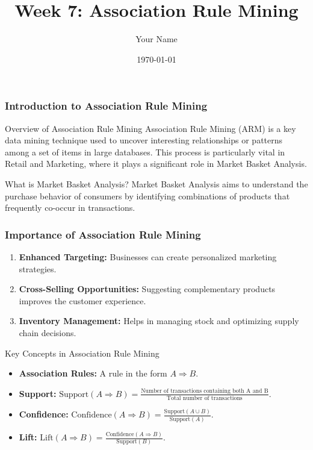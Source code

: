 \documentclass{beamer}
\title{Week 7: Association Rule Mining}
\author{Your Name}
\institute{Your Institution}
\date{\today}
\begin{document}
\frame{\titlepage}

\begin{frame}[fragile]
    \frametitle{Introduction to Association Rule Mining}
    
    \begin{block}{Overview of Association Rule Mining}
        Association Rule Mining (ARM) is a key data mining technique used to uncover interesting relationships or patterns among a set of items in large databases. This process is particularly vital in Retail and Marketing, where it plays a significant role in Market Basket Analysis.
    \end{block}
    
    \begin{block}{What is Market Basket Analysis?}
        Market Basket Analysis aims to understand the purchase behavior of consumers by identifying combinations of products that frequently co-occur in transactions.
    \end{block}
\end{frame}

\begin{frame}[fragile]
    \frametitle{Importance of Association Rule Mining}
    
    \begin{enumerate}
        \item \textbf{Enhanced Targeting:} Businesses can create personalized marketing strategies.
        
        \item \textbf{Cross-Selling Opportunities:} Suggesting complementary products improves the customer experience.
        
        \item \textbf{Inventory Management:} Helps in managing stock and optimizing supply chain decisions.
    \end{enumerate}

    \begin{block}{Key Concepts in Association Rule Mining}
        \begin{itemize}
            \item \textbf{Association Rules:} A rule in the form \(A \Rightarrow B\).
            \item \textbf{Support:} \(\text{Support}(A \Rightarrow B) = \frac{\text{Number of transactions containing both A and B}}{\text{Total number of transactions}}\).
            \item \textbf{Confidence:} \(\text{Confidence}(A \Rightarrow B) = \frac{\text{Support}(A \cup B)}{\text{Support}(A)}\).
            \item \textbf{Lift:} \(\text{Lift}(A \Rightarrow B) = \frac{\text{Confidence}(A \Rightarrow B)}{\text{Support}(B)}\).
        \end{itemize}
    \end{block}
\end{frame}
\end{document}
